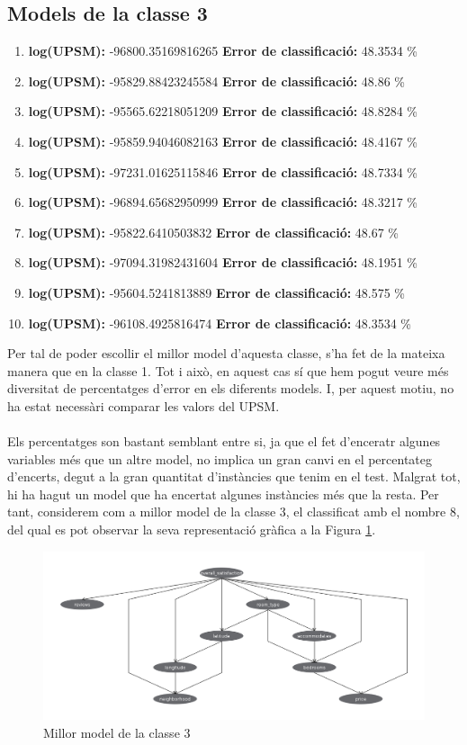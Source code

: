 	\subsection{Models de la classe 3}
	\begin{enumerate}
		\item \textbf{log(UPSM):} -96800.35169816265 \textbf{Error de classificació:} 48.3534 \%
		\item \textbf{log(UPSM):} -95829.88423245584 \textbf{Error de classificació:} 48.86 \%
		\item \textbf{log(UPSM):} -95565.62218051209 \textbf{Error de classificació:} 48.8284 \%
		\item \textbf{log(UPSM):} -95859.94046082163 \textbf{Error de classificació:} 48.4167 \%
		\item \textbf{log(UPSM):} -97231.01625115846 \textbf{Error de classificació:} 48.7334 \%
		\item \textbf{log(UPSM):} -96894.65682950999 \textbf{Error de classificació:} 48.3217 \%
		\item \textbf{log(UPSM):} -95822.6410503832 \textbf{Error de classificació:} 48.67 \%
		\item \textbf{log(UPSM):} -97094.31982431604 \textbf{Error de classificació:} 48.1951 \%
		\item \textbf{log(UPSM):} -95604.5241813889 \textbf{Error de classificació:} 48.575 \%
		\item \textbf{log(UPSM):} -96108.4925816474 \textbf{Error de classificació:} 48.3534 \%
	\end{enumerate}
	\vspace{0.5cm}
	Per tal de poder escollir el millor model d'aquesta classe, s'ha fet de la mateixa manera que en la classe 1. Tot i això, en aquest cas sí que hem pogut veure més diversitat de percentatges d'error en els diferents models. I, per aquest motiu, no ha estat necessàri comparar les valors del UPSM.\\\\
	Els percentatges son bastant semblant entre si, ja que el fet d'enceratr algunes variables més que un altre model, no implica un gran canvi en el percentateg d'encerts, degut a la gran quantitat d'instàncies que tenim en el test. Malgrat tot, hi ha hagut un model que ha encertat algunes instàncies més que la resta. Per tant, considerem com a millor model de la classe 3, el classificat amb el nombre 8, del qual es pot observar la seva representació gràfica a la Figura \ref{fig:model3}.
	\begin{figure}[H]
		\centering
		\includegraphics[width=15cm]{imgs/modelclasse3.png}
		\caption{Millor model de la classe 3}
		\label{fig:model3}
	\end{figure}
